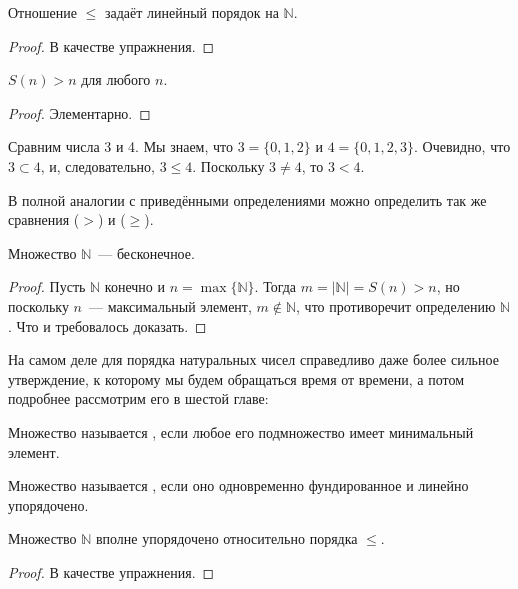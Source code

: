 \begin{thm}
Отношение $\le$ задаёт линейный порядок на $\mathbb{N}$.
\end{thm}
\begin{proof}В качестве упражнения.\end{proof}

\begin{thm}
$S(n) > n$ для любого $n$.
\end{thm}
\begin{proof}
Элементарно.
\end{proof}

\begin{example}
Сравним числа 3 и 4. Мы знаем, что $3 = \{0, 1, 2\}$ и $4 = \{0, 1, 2, 3\}$. Очевидно, что $3\subset 4$, и, следовательно, $3\le4$. Поскольку $3\not= 4$, то $3<4$.
\end{example}

В полной аналогии с приведёнными определениями можно определить так же сравнения  ($>$) и  ($\ge$).

\begin{thm}
Множество $\mathbb{N}$~--- бесконечное.
\end{thm}
\begin{proof}
Пусть $\mathbb{N}$ конечно и $n = \max\{\mathbb{N}\}$. Тогда $m = |\mathbb{N}| = S(n) > n$, но поскольку $n$~--- максимальный элемент, $m\not\in\mathbb{N}$, что противоречит определению $\mathbb{N}$. Что и требовалось доказать.
\end{proof}

На самом деле для порядка натуральных чисел справедливо даже более сильное утверждение, к которому мы будем обращаться время от времени, а потом подробнее рассмотрим его в шестой главе:

\begin{definition}
Множество называется , если любое его подмножество имеет минимальный элемент.
\end{definition}

\begin{definition}
Множество называется , если оно одновременно фундированное и линейно упорядочено.
\end{definition}

\begin{thm}
Множество $\mathbb{N}$ вполне упорядочено относительно порядка $\le$.
\end{thm}
\begin{proof}
В качестве упражнения.
\end{proof}

